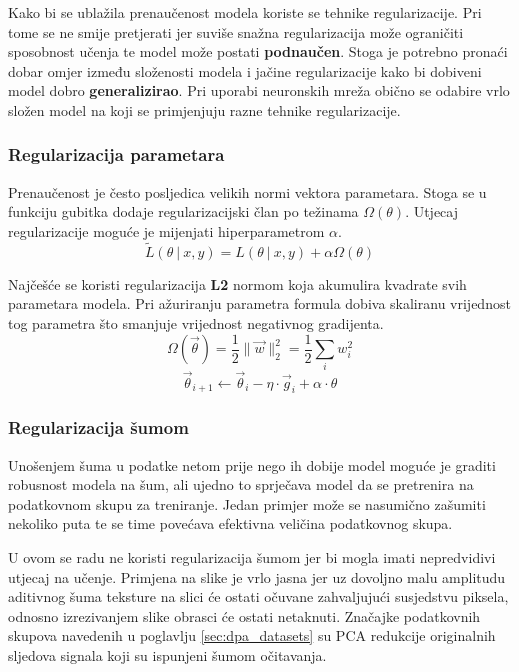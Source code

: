 \documentclass[times, utf8, numeric, diplomski]{fer}
\def\probsep{\ |\ }
\def\TODO#1{\noindent\textcolor{red}{TODO: \textit{#1}}\newline}
\def\todo#1{\TODO{#1}}
\begin{document}
Kako bi se ublažila prenaučenost modela koriste se tehnike regularizacije. Pri tome se ne smije pretjerati jer suviše snažna regularizacija može ograničiti sposobnost učenja te model može postati \textbf{podnaučen}. Stoga je potrebno pronaći dobar omjer između složenosti modela i jačine regularizacije kako bi dobiveni model dobro \textbf{generalizirao}. Pri uporabi neuronskih mreža obično se odabire vrlo složen model na koji se primjenjuju razne tehnike regularizacije.

\subsubsection{Regularizacija parametara}
Prenaučenost je često posljedica velikih normi vektora parametara. Stoga se u funkciju gubitka dodaje regularizacijski član po težinama $\Omega(\theta)$. Utjecaj regularizacije moguće je mijenjati hiperparametrom $\alpha$.
\begin{equation}
\label{eq:weights_regularization}
\tilde{L}(\theta \probsep x,y) = L(\theta \probsep x,y) + \alpha\Omega(\theta)
\end{equation}

Najčešće se koristi regularizacija \textbf{L2} normom koja akumulira kvadrate svih parametara modela. Pri ažuriranju parametra formula dobiva skaliranu vrijednost tog parametra što smanjuje vrijednost negativnog gradijenta.
\begin{equation}
\Omega(\vec{\theta}) = \frac{1}{2} \|\vec{w}\|_2^2 = \frac{1}{2} \sum_i w_i^2
\end{equation}
\begin{equation}
\vec{\theta}_{i+1} \gets \vec{\theta}_i - \eta \cdot \vec{g}_i + \alpha \cdot \theta
\end{equation}


\iffalse %
\subsubsection{Regularizacija šumom}
Unošenjem šuma u podatke netom prije nego ih dobije model moguće je graditi robusnost modela na šum, ali ujedno to sprječava model da se pretrenira na podatkovnom skupu za treniranje. Jedan primjer može se nasumično zašumiti nekoliko puta te se time povećava efektivna veličina podatkovnog skupa.

U ovom se radu ne koristi regularizacija šumom jer bi mogla imati nepredvidivi utjecaj na učenje. Primjena na slike je vrlo jasna jer uz dovoljno malu amplitudu aditivnog šuma teksture na slici će ostati očuvane zahvaljujući susjedstvu piksela, odnosno izrezivanjem slike obrasci će ostati netaknuti. Značajke podatkovnih skupova navedenih u poglavlju \ref{sec:dpa_datasets} su PCA redukcije originalnih sljedova signala koji su ispunjeni šumom očitavanja.
\end{document}
